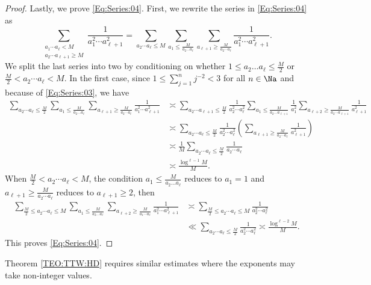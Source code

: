 \documentclass[12pt,a4paper]{amsart}
\begin{document}
\begin{proof}
Lastly, we prove \eqref{Eq:Series:04}. First, we rewrite the series in \eqref{Eq:Series:04} as
\[
\sum_{\substack{a_1\cdots a_{\ell}<M \\ a_2\cdots a_{\ell+1}\geq M}} \frac{1}{a_1^2\cdots  a_{\ell+1}^2 }
=
\sum_{a_2\cdots a_{\ell}\leq M}
\sum_{ a_1\leq \frac{M}{a_2\ldots a_{\ell}} } 
\sum_{a_{\ell+1} \geq \frac{M}{a_2\cdots a_{\ell}}} 
\frac{1}{a_1^2  \cdots a_{\ell+1}^2}.
\] 
We split the last series into two by conditioning on whether $1\leq a_2\ldots a_{\ell}\leq \frac{M}{2}$ or $\frac{M}{2}< a_2\cdots a_{\ell} < M$. In the first case, since $1\leq \sum_{j=1}^n j^{-2}< 3$ for all $n\in\Na$ and because of \eqref{Eq:Series:03}, we have
\begin{align*}
\sum_{a_2\cdots a_{\ell}\leq \frac{M}{2} }
\sum_{ a_1\leq \frac{M}{a_2\ldots a_{\ell}} } 
\sum_{a_{\ell+1} \geq \frac{M}{a_2\cdots a_{\ell}}} 
\frac{1}{a_1^2  \cdots a_{\ell+1}^2}
&\asymp 
\sum_{a_2\cdots a_{\ell+1}\leq \frac{M}{2} } 
\frac{1}{a_2^2\cdots a_{\ell}^2}
\sum_{ a_1\leq \frac{M}{a_2\ldots a_{\ell+1}} } 
\frac{1}{a_1^2}
\sum_{a_{\ell+2} \geq \frac{M}{a_2\cdots a_{\ell+1}}} 
\frac{1}{a_{\ell+1}^2} \\
&\asymp 
\sum_{a_2\cdots a_{\ell}\leq \frac{M}{2} }
\frac{1}{a_2^2 \cdots a_{\ell}^2}
\left( \sum_{a_{\ell+1} \geq \frac{M}{a_2\cdots a_{\ell}}} \frac{1}{a_{\ell+ 1}^2}\right)   \\
&\asymp
\frac{1}{M}
\sum_{a_2\cdots a_{\ell}\leq \frac{M}{2} }
\frac{1}{a_2 \cdots a_{\ell}} \\
&\asymp
\frac{\log^{\ell-1}M}{M}.
\end{align*}
When $\frac{M}{2}< a_2\cdots a_{\ell} < M$, the condition $a_1\leq \frac{M}{a_2\ldots a_{\ell}}$ reduces to $a_1=1$ and $a_{\ell+1} \geq \frac{M}{a_2\cdots a_{\ell}}$ reduces to $a_{\ell+1}\geq 2$, then
\begin{align*}
\sum_{\frac{M}{2}\leq a_2\cdots a_{\ell}\leq M }
\sum_{ a_1\leq \frac{M}{a_2\ldots a_{\ell}} } 
\sum_{a_{\ell+2} \geq \frac{M}{a_1\cdots a_{\ell}}} 
\frac{1}{a_1^2 \cdots a_{\ell+1}^2}
&\asymp
\sum_{\frac{M}{2}\leq a_2\cdots a_{\ell}\leq M }
\frac{1}{a_2^2 \cdots a_{\ell}^2} \\
&\ll
\sum_{a_2\cdots a_{\ell}\leq \frac{M}{2} }
\frac{1}{a_2^2 \cdots a_{\ell}^2} 
\asymp
\frac{\log^{\ell-2}M}{M}.
\end{align*}
This proves \eqref{Eq:Series:04}.
\end{proof}
Theorem \ref{TEO:TTW:HD} requires similar estimates where the exponents may take non-integer values.
\end{document}

